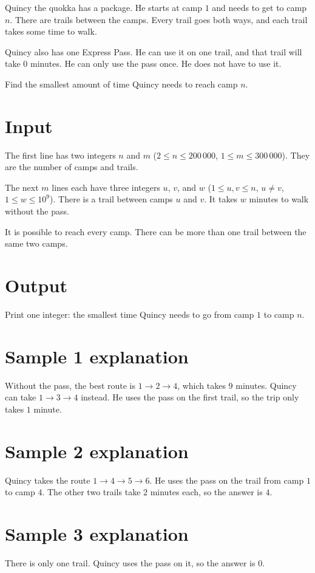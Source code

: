 
Quincy the quokka has a package. He starts at camp $1$ and needs to get to camp $n$. There are trails between the camps. Every trail goes both ways, and each trail takes some time to walk.

Quincy also has one Express Pass. He can use it on one trail, and that trail will take $0$ minutes. He can only use the pass once. He does not have to use it.

Find the smallest amount of time Quincy needs to reach camp $n$.

\section*{Input}

The first line has two integers $n$ and $m$ ($2 \le n \le 200\,000$, $1 \le m \le 300\,000$). They are the number of camps and trails.

The next $m$ lines each have three integers $u$, $v$, and $w$ ($1 \le u,v \le n$, $u \ne v$, $1 \le w \le 10^9$). There is a trail between camps $u$ and $v$. It takes $w$ minutes to walk without the pass.

It is possible to reach every camp. There can be more than one trail between the same two camps.

\section*{Output}

Print one integer: the smallest time Quincy needs to go from camp $1$ to camp $n$.

\section*{Sample 1 explanation}

Without the pass, the best route is $1 \rightarrow 2 \rightarrow 4$, which takes $9$ minutes. Quincy can take $1 \rightarrow 3 \rightarrow 4$ instead. He uses the pass on the first trail, so the trip only takes $1$ minute.

\section*{Sample 2 explanation}

Quincy takes the route $1 \rightarrow 4 \rightarrow 5 \rightarrow 6$. He uses the pass on the trail from camp $1$ to camp $4$. The other two trails take $2$ minutes each, so the answer is $4$.

\section*{Sample 3 explanation}

There is only one trail. Quincy uses the pass on it, so the answer is $0$.
